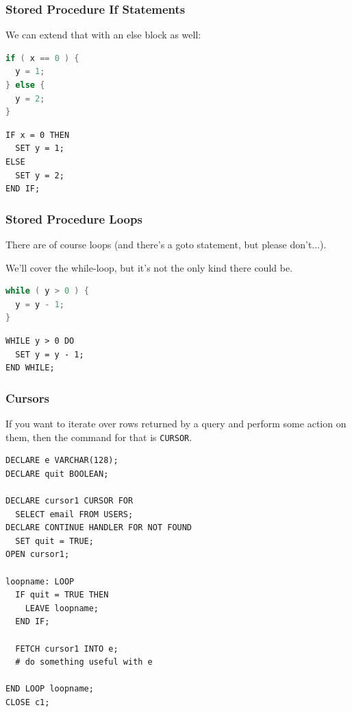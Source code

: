 \begin{frame}[fragile]
\frametitle{Stored Procedure If Statements}

We can extend that with an else block as well:

\begin{multicols}{2}
\begin{lstlisting}[language=C]
if ( x == 0 ) {
  y = 1;
} else {
  y = 2;
}
\end{lstlisting}
\columnbreak
\begin{verbatim}
IF x = 0 THEN
  SET y = 1;
ELSE
  SET y = 2;
END IF;
\end{verbatim}
\end{multicols}


\end{frame}

\begin{frame}[fragile]
\frametitle{Stored Procedure Loops}

There are of course loops (and there's a goto statement, but please don't...). 

We'll cover the while-loop, but it's not the only kind there could be.

\begin{multicols}{2}
\begin{lstlisting}[language=C]
while ( y > 0 ) {
  y = y - 1;
} 
\end{lstlisting}
\columnbreak
\begin{verbatim}
WHILE y > 0 DO
  SET y = y - 1;
END WHILE;
\end{verbatim}
\end{multicols}

\end{frame}

\begin{frame}[fragile]
\frametitle{Cursors}

If you want to iterate over rows returned by a query and perform some action on them, then the command for that is \texttt{CURSOR}. 

{\scriptsize
\begin{verbatim}
DECLARE e VARCHAR(128);
DECLARE quit BOOLEAN;

DECLARE cursor1 CURSOR FOR 
  SELECT email FROM USERS;
DECLARE CONTINUE HANDLER FOR NOT FOUND
  SET quit = TRUE;  
OPEN cursor1;

loopname: LOOP
  IF quit = TRUE THEN
    LEAVE loopname;
  END IF;

  FETCH cursor1 INTO e;
  # do something useful with e

END LOOP loopname;
CLOSE c1;
\end{verbatim}
}


\end{frame}

